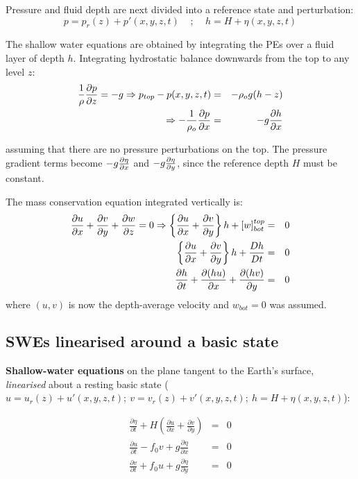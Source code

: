 Pressure and fluid depth are next divided into
a reference state and perturbation:
\begin{equation*}
	p=p_r(z)+p'(x,y,z,t)~~~~~;~~~~~h=H+\eta(x,y,z,t)
\end{equation*}

The shallow water equations are obtained by integrating the PEs
over a fluid layer of depth $h$. Integrating hydrostatic balance
downwards from the top to any level $z$:
\begin{eqnarray*}
	\frac{1}{\rho}\frac{\partial p}{\partial z}=-g \Rightarrow p_{top}-p(x,y,z,t) & = & -\rho_o g (h-z) \\
	\Rightarrow -\frac{1}{\rho_o} \frac{\partial p}{\partial x} & = & -g \frac{\partial h}{\partial x} \nonumber
\end{eqnarray*}

assuming that there are no pressure perturbations on the top.
The pressure gradient terms become $-g\frac{\partial \eta}{\partial x}$ and
$-g\frac{\partial \eta}{\partial y}$, since the reference depth $H$ must be constant.

The mass conservation equation integrated vertically is:
\begin{eqnarray*}
	\frac{\partial u}{\partial x}+\frac{\partial v}{\partial y}+\frac{\partial w}{\partial z} = 0 \Rightarrow \left\{ \frac{\partial u}{\partial x}+\frac{\partial v}{\partial y} \right\} h+[w]^{top}_{bot} & = & 0 \\
	\left\{ \frac{\partial u}{\partial x}+\frac{\partial v}{\partial y} \right\} h+\frac{D h}{D t} & = & 0 \nonumber \\
	\frac{\partial h}{\partial t}+\frac{\partial (hu)}{\partial x}+\frac{\partial (hv)}{\partial y} & = & 0 \nonumber
\end{eqnarray*}
where $(u,v)$ is now the depth-average velocity and $w_{bot}=0$ was assumed. 


\subsection{SWEs linearised around a basic state} 

{\bf Shallow-water equations} on the
plane tangent to the Earth's surface, {\em linearised} about a resting basic state ($u=u_r(z)+u'(x,y,z,t); ~ v=v_r(z)+v'(x,y,z,t); ~ h=H+\eta(x,y,z,t)$):

\begin{eqnarray}
	\frac{\partial \eta}{\partial t} + H \left(
	\frac{\partial u}{\partial x}+\frac{\partial v}{\partial y}\right) & = & 0 \nonumber \\
	\frac{\partial u}{\partial t} - f_0 v  + g\frac{\partial \eta}{\partial x} & = & 0 \\
	\frac{\partial v}{\partial t} + f_0 u  + g\frac{\partial \eta}{\partial y} & = & 0 \nonumber
\label{eqn:SWEs-2d}
\end{eqnarray}

